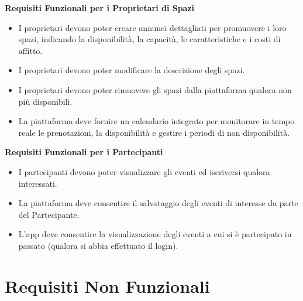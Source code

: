\documentclass[9pt]{extarticle}
\begin{document}
\textbf{Requisiti Funzionali per i Proprietari di Spazi}
\begin{itemize}
	\item \FR I proprietari devono poter creare annunci dettagliati per promuovere i loro spazi, indicando la disponibilità, la capacità, le caratteristiche e i costi di affitto.
	\item \FR I proprietari devono poter modificare la descrizione degli spazi.
	\item \FR I proprietari devono poter rimuovere gli spazi dalla piattaforma qualora non più disponibili.
	\item \FR La piattaforma deve fornire un calendario integrato per monitorare in tempo reale le prenotazioni, la disponibilità e gestire i periodi di non disponibilità.
\end{itemize}


\textbf{Requisiti Funzionali per i Partecipanti}
\begin{itemize}
	\item \FR I partecipanti devono poter visualizzare gli eventi ed iscriversi qualora interessati.
	\item \FR La piattaforma deve consentire il salvataggio degli eventi di interesse da parte del Partecipante.
	\item \FR L'app deve consentire la visualizzazione degli eventi a cui si è partecipato in passato (qualora si abbia effettuato il login).
\end{itemize}

\section{Requisiti Non Funzionali}
\end{document}
